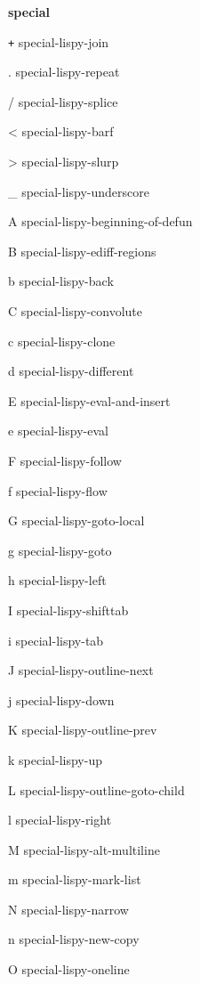 \documentclass[a4paper,10pt]{article}
\renewcommand\section[1]{\bigskip\par\textbf{\large#1}\medskip}
\newcommand\keyify[1]{\keys{\ttfamily#1}}
\begin{document}
\begin{multicols*}{3}
\section{special}
\begin{keylist}[labelwidth=\widthof{\keyify{+}}]
	\item[\texttt{+}] special-lispy-join
	\item[.] special-lispy-repeat
	\item[/] special-lispy-splice
	\item[<] special-lispy-barf
	\item[>] special-lispy-slurp
	\item[\_] special-lispy-underscore
	\item[A] special-lispy-beginning-of-defun
	\item[B] special-lispy-ediff-regions
	\item[b] special-lispy-back
	\item[C] special-lispy-convolute
	\item[c] special-lispy-clone
	\item[d] special-lispy-different
	\item[E] special-lispy-eval-and-insert
	\item[e] special-lispy-eval
	\item[F] special-lispy-follow
	\item[f] special-lispy-flow
	\item[G] special-lispy-goto-local
	\item[g] special-lispy-goto
	\item[h] special-lispy-left
	\item[I] special-lispy-shifttab
	\item[i] special-lispy-tab
	\item[J] special-lispy-outline-next
	\item[j] special-lispy-down
	\item[K] special-lispy-outline-prev
	\item[k] special-lispy-up
	\item[L] special-lispy-outline-goto-child
	\item[l] special-lispy-right
	\item[M] special-lispy-alt-multiline
	\item[m] special-lispy-mark-list
	\item[N] special-lispy-narrow
	\item[n] special-lispy-new-copy
	\item[O] special-lispy-oneline

\end{keylist}
\end{multicols*}
\end{document}

